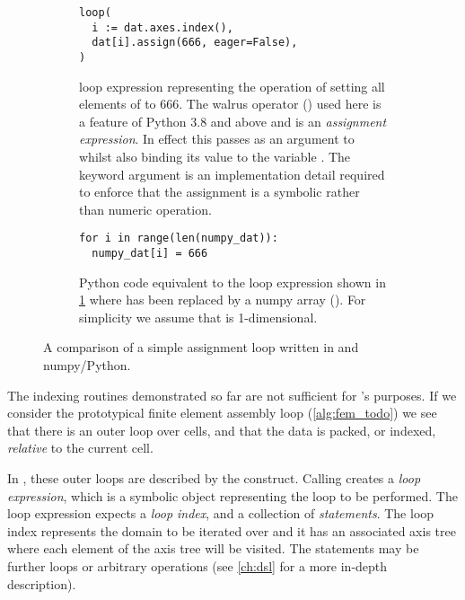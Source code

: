 \documentclass[thesis]{subfiles}
\begin{document}
\begin{figure}[h]
  \centering
  \begin{subfigure}[t]{.48\textwidth}
    \centering
    \begin{verbatim}
loop(
  i := dat.axes.index(),
  dat[i].assign(666, eager=False),
)
    \end{verbatim}
    \caption{
       loop expression representing the operation of setting all elements of  to 666.
      The walrus operator (\pycode{:=}) used here is a feature of Python 3.8 and above and is an \textit{assignment expression}.
      In effect this passes  as an argument to  whilst also binding its value to the variable .
      The keyword argument  is an implementation detail required to enforce that the assignment is a symbolic rather than numeric operation.
    }
    \label{fig:simple_loop_pyop3}
  \end{subfigure}
  \hfill
  \begin{subfigure}[t]{.48\textwidth}
    \centering
    \begin{verbatim}
for i in range(len(numpy_dat)):
  numpy_dat[i] = 666

    \end{verbatim}
    \caption{
      Python code equivalent to the loop expression shown in \ref{fig:simple_loop_pyop3} where  has been replaced by a numpy array ().
      For simplicity we assume that  is 1-dimensional.
    }
    \label{fig:simple_loop_python}
  \end{subfigure}

  \caption{A comparison of a simple assignment loop written in  and numpy/Python.}
  \label{fig:simple_loop}
\end{figure}

The indexing routines demonstrated so far are not sufficient for 's purposes.
If we consider the prototypical finite element assembly loop (\cref{alg:fem_todo}) we see that there is an outer loop over cells, and that the data is packed, or indexed, \textit{relative} to the current cell.

In , these outer loops are described by the  construct.
Calling  creates a \textit{loop expression}, which is a symbolic object representing the loop to be performed.
The loop expression expects a \textit{loop index}, and a collection of \textit{statements}.
The loop index represents the domain to be iterated over and it has an associated axis tree where each element of the axis tree will be visited.
The statements may be further loops or arbitrary operations (see \cref{ch:dsl} for a more in-depth description).
\end{document}
